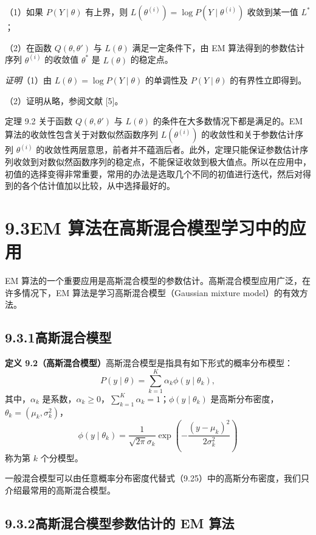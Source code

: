 \documentclass[UTF8, 12pt, fontset=fandol, oneside]{ctexart}
\begin{document}
（1）如果 $P(Y\mid\theta)$ 有上界，则 $L(\theta^{(i)})=\log P(Y\mid\theta^{(i)})$ 收敛到某一值 $L^*$；

（2）在函数 $Q(\theta,\theta')$ 与 $L(\theta)$ 满足一定条件下，由 EM 算法得到的参数估计序列 $\theta^{(i)}$ 的收敛值 $\theta^*$ 是 $L(\theta)$ 的稳定点。

\noindent\textit{证明}\quad （1）由 $L(\theta)=\log P(Y\mid\theta)$ 的单调性及 $P(Y\mid\theta)$ 的有界性立即得到。

（2）证明从略，参阅文献 [5]。

定理 9.2 关于函数 $Q(\theta,\theta')$ 与 $L(\theta)$ 的条件在大多数情况下都是满足的。EM 算法的收敛性包含关于对数似然函数序列 $L(\theta^{(i)})$ 的收敛性和关于参数估计序列 $\theta^{(i)}$ 的收敛性两层意思，前者并不蕴涵后者。此外，定理只能保证参数估计序列收敛到对数似然函数序列的稳定点，不能保证收敛到极大值点。所以在应用中，初值的选择变得非常重要，常用的办法是选取几个不同的初值进行迭代，然后对得到的各个估计值加以比较，从中选择最好的。

\section*{9.3\quad EM 算法在高斯混合模型学习中的应用}

EM 算法的一个重要应用是高斯混合模型的参数估计。高斯混合模型应用广泛，在许多情况下，EM 算法是学习高斯混合模型（Gaussian mixture model）的有效方法。

\subsection*{9.3.1\quad 高斯混合模型}

\noindent\textbf{定义 9.2（高斯混合模型）}\quad 高斯混合模型是指具有如下形式的概率分布模型：
\begin{equation}
  P(y\mid\theta)=\sum_{k=1}^K \alpha_k\phi(y\mid\theta_k),
  \tag{9.24}
\end{equation}
其中，$\alpha_k$ 是系数，$\alpha_k\geq0$，$\sum_{k=1}^K \alpha_k=1$；$\phi(y\mid\theta_k)$ 是高斯分布密度，$\theta_k=(\mu_k,\sigma_k^2)$，
\begin{equation}
  \phi(y\mid\theta_k)=\frac1{\sqrt{2\pi}\sigma_k}
  \exp\left(-\frac{(y-\mu_k)^2}{2\sigma_k^2}\right)
  \tag{9.25}
\end{equation}
称为第 $k$ 个分模型。

一般混合模型可以由任意概率分布密度代替式（9.25）中的高斯分布密度，我们只介绍最常用的高斯混合模型。

\subsection*{9.3.2\quad 高斯混合模型参数估计的 EM 算法}
\end{document}
